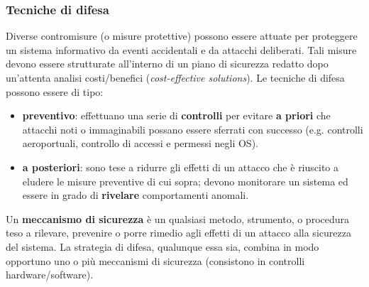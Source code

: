 \subsubsection{Tecniche di difesa}
Diverse contromisure (o misure protettive) possono essere attuate per proteggere un sistema informativo da eventi accidentali e da
attacchi deliberati. Tali misure devono essere strutturate all'interno di un piano di sicurezza redatto dopo un'attenta analisi costi/benefici (\textit{cost-effective solutions}).
Le tecniche di difesa possono essere di tipo:
\begin{itemize} 
  \item \textbf{preventivo}: effettuano una serie di \textbf{controlli} per evitare \textbf{a priori} che attacchi noti o immaginabili possano essere sferrati con successo (e.g. controlli aeroportuali, controllo di accessi e permessi negli OS).
  \item \textbf{a posteriori}: sono tese a ridurre gli effetti di un attacco che è riuscito a eludere le misure preventive di cui sopra; devono monitorare un sistema ed essere in grado di \textbf{rivelare} comportamenti anomali.
\end{itemize}

Un \textbf{meccanismo di sicurezza} è un qualsiasi metodo, strumento, o procedura teso a rilevare, prevenire o porre rimedio agli effetti di un attacco alla sicurezza del sistema. La strategia di difesa, qualunque essa sia, combina in modo opportuno uno o più meccanismi di sicurezza (consistono in controlli hardware/software).

